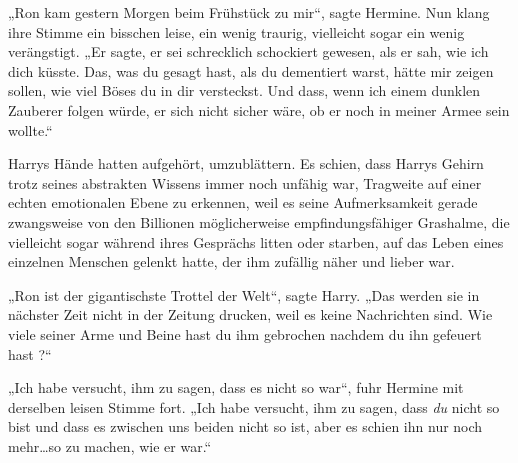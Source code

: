 „Ron kam gestern Morgen beim Frühstück zu mir“, sagte Hermine. Nun klang ihre Stimme ein bisschen leise, ein wenig traurig, vielleicht sogar ein wenig verängstigt. „Er sagte, er sei schrecklich schockiert gewesen, als er sah, wie ich dich küsste. Das, was du gesagt hast, als du dementiert warst, hätte mir zeigen sollen, wie viel Böses du in dir versteckst. Und dass, wenn ich einem dunklen Zauberer folgen würde, er sich nicht sicher wäre, ob er noch in meiner Armee sein wollte.“

Harrys Hände hatten aufgehört, umzublättern. Es schien, dass Harrys Gehirn trotz seines abstrakten Wissens immer noch unfähig war, Tragweite auf einer echten emotionalen Ebene zu erkennen, weil es seine Aufmerksamkeit gerade zwangsweise von den Billionen möglicherweise empfindungsfähiger Grashalme, die vielleicht sogar während ihres Gesprächs litten oder starben, auf das Leben eines einzelnen Menschen gelenkt hatte, der ihm zufällig näher und lieber war.

„Ron ist der gigantischste Trottel der Welt“, sagte Harry. „Das werden sie in nächster Zeit nicht in der Zeitung drucken, weil es keine Nachrichten sind. Wie viele seiner Arme und Beine hast du ihm gebrochen nachdem du ihn gefeuert hast ?“

„Ich habe versucht, ihm zu sagen, dass es nicht so war“, fuhr Hermine mit derselben leisen Stimme fort. „Ich habe versucht, ihm zu sagen, dass \emph{du} nicht so bist und dass es zwischen uns beiden nicht so ist, aber es schien ihn nur noch mehr…so zu machen, wie er war.“

